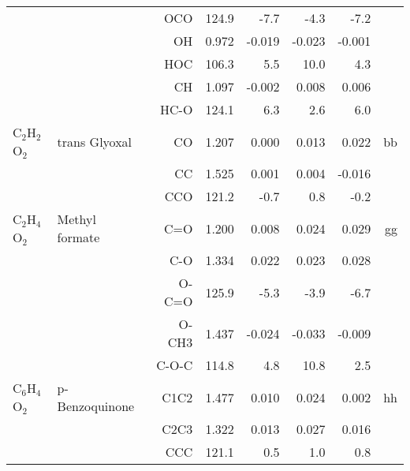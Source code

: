 \begin{table}
\begin{center}
\begin{tabular}{llrrrrrr}
        &                                    &OCO         &     124.9   &      -7.7 &      -4.3 &      -7.2   &       \\
        &                                    &OH            &     0.972   &    -0.019 &    -0.023 &    -0.001 &       \\
        &                                    &HOC         &     106.3   &       5.5 &      10.0 &       4.3   &       \\
        &                                    &CH            &     1.097   &    -0.002 &     0.008 &     0.006 &       \\
        &                                    &HC-O        &     124.1   &       6.3 &       2.6 &       6.0   &       \\
 C$_2$H$_2$O$_2$      & trans Glyoxal                      &CO            &     1.207   &     0.000 &     0.013 &     0.022 &    bb \\
        &                                    &CC            &     1.525   &     0.001 &     0.004 &    -0.016 &       \\
        &                                    &CCO         &     121.2   &      -0.7 &       0.8 &      -0.2   &       \\
 C$_2$H$_4$O$_2$      & Methyl formate                     &C=O           &     1.200   &     0.008 &     0.024 &     0.029 &    gg \\
        &                                    &C-O           &     1.334   &     0.022 &     0.023 &     0.028 &       \\
        &                                    &O-C=O       &     125.9   &      -5.3 &      -3.9 &      -6.7   &       \\
        &                                    &O-CH3         &     1.437   &    -0.024 &    -0.033 &    -0.009 &       \\
        &                                    &C-O-C       &     114.8   &       4.8 &      10.8 &       2.5   &       \\
 C$_6$H$_4$O$_2$      & p-Benzoquinone                     &C1C2          &     1.477   &     0.010 &     0.024 &     0.002 &    hh \\
        &                                    &C2C3          &     1.322   &     0.013 &     0.027 &     0.016 &       \\
        &                                    &CCC         &     121.1   &       0.5 &       1.0 &       0.8   &       \\

\end{tabular}
\end{center}
\end{table}
